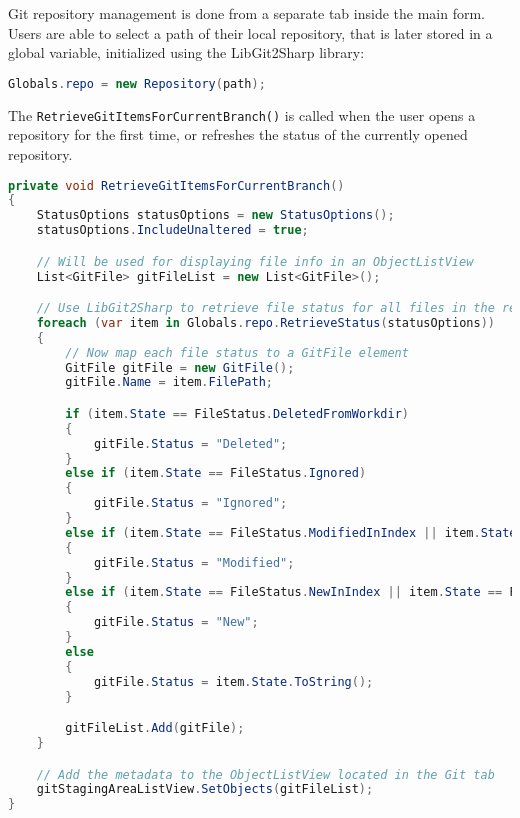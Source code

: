 Git repository management is done from a separate tab inside the main form. Users are able to select a path of their local repository, that is later stored in a global variable, initialized using the LibGit2Sharp library:

\begin{lstlisting}[language=csharp, caption={Using LibGit2Sharp to scan a local repository provided as a path}]
Globals.repo = new Repository(path);
\end{lstlisting}

The \texttt{RetrieveGitItemsForCurrentBranch()} is called when the user opens a repository for the first time, or refreshes the status of the currently opened repository.

\begin{lstlisting}[language=csharp, caption={The RetrieveGitItemsForCurrentBranch() method that retrieves the status of all files located in a selected repository and displays them in an ObjectListView control}]
private void RetrieveGitItemsForCurrentBranch()
{
    StatusOptions statusOptions = new StatusOptions();
    statusOptions.IncludeUnaltered = true;

    // Will be used for displaying file info in an ObjectListView
    List<GitFile> gitFileList = new List<GitFile>();

    // Use LibGit2Sharp to retrieve file status for all files in the repository
    foreach (var item in Globals.repo.RetrieveStatus(statusOptions))
    {
        // Now map each file status to a GitFile element
        GitFile gitFile = new GitFile();
        gitFile.Name = item.FilePath;

        if (item.State == FileStatus.DeletedFromWorkdir)
        {
            gitFile.Status = "Deleted";
        }
        else if (item.State == FileStatus.Ignored)
        {
            gitFile.Status = "Ignored";
        }
        else if (item.State == FileStatus.ModifiedInIndex || item.State == FileStatus.ModifiedInWorkdir)
        {
            gitFile.Status = "Modified";
        }
        else if (item.State == FileStatus.NewInIndex || item.State == FileStatus.NewInWorkdir)
        {
            gitFile.Status = "New";
        }
        else
        {
            gitFile.Status = item.State.ToString();
        }

        gitFileList.Add(gitFile);
    }

    // Add the metadata to the ObjectListView located in the Git tab
    gitStagingAreaListView.SetObjects(gitFileList);
}
\end{lstlisting}

